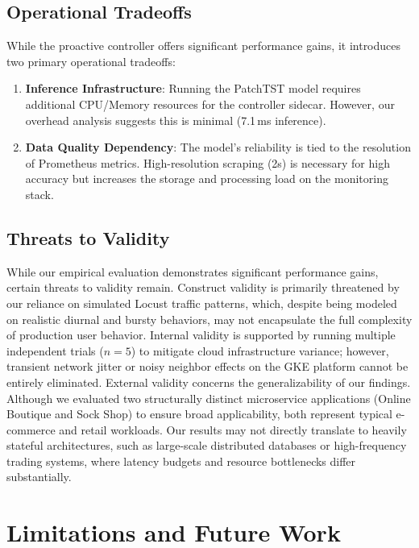 \documentclass[conference]{IEEEtran}
\begin{document}
\subsection{Operational Tradeoffs}
While the proactive controller offers significant performance gains, it introduces two primary operational tradeoffs:
\begin{enumerate}
    \item \textbf{Inference Infrastructure}: Running the PatchTST model requires additional CPU/Memory resources for the controller sidecar. However, our overhead analysis suggests this is minimal (7.1\,ms inference).
    \item \textbf{Data Quality Dependency}: The model's reliability is tied to the resolution of Prometheus metrics. High-resolution scraping (2s) is necessary for high accuracy but increases the storage and processing load on the monitoring stack.
\end{enumerate}

\subsection{Threats to Validity}
While our empirical evaluation demonstrates significant performance gains, certain threats to validity remain. Construct validity is primarily threatened by our reliance on simulated Locust traffic patterns, which, despite being modeled on realistic diurnal and bursty behaviors, may not encapsulate the full complexity of production user behavior. Internal validity is supported by running multiple independent trials ($n=5$) to mitigate cloud infrastructure variance; however, transient network jitter or noisy neighbor effects on the GKE platform cannot be entirely eliminated. External validity concerns the generalizability of our findings. Although we evaluated two structurally distinct microservice applications (Online Boutique and Sock Shop) to ensure broad applicability, both represent typical e-commerce and retail workloads. Our results may not directly translate to heavily stateful architectures, such as large-scale distributed databases or high-frequency trading systems, where latency budgets and resource bottlenecks differ substantially.

\section{Limitations and Future Work}\label{sec:limitations}
\end{document}
